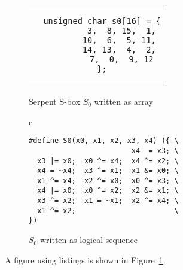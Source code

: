 \begin{figure}
\centering
\begin{minipage}[b]{0.45\textwidth}
\centering
\begin{tabular}{c}
\begin{lstlisting}
  unsigned char s0[16] = {
          3,  8, 15,  1,
         10,  6,  5, 11,
         14, 13,  4,  2,
          7,  0,  9, 12
  };
\end{lstlisting}
\end{tabular}
\caption{Serpent S-box $S_0$ written as array}
\label{fig:serpents0a}
\end{minipage}
\hspace{0.25cm}
\vline
\hspace{0.25cm}
\begin{minipage}[b]{0.45\textwidth}
\centering
\begin{tabular}{c}
\begin{lstlisting}
#define S0(x0, x1, x2, x3, x4) ({ \
                        x4  = x3; \
  x3 |= x0;  x0 ^= x4;  x4 ^= x2; \
  x4 = ~x4;  x3 ^= x1;  x1 &= x0; \
  x1 ^= x4;  x2 ^= x0;  x0 ^= x3; \
  x4 |= x0;  x0 ^= x2;  x2 &= x1; \
  x3 ^= x2;  x1 = ~x1;  x2 ^= x4; \
  x1 ^= x2;                       \
})
\end{lstlisting}
\end{tabular}
\caption{$S_0$ written as logical sequence}
\label{fig:serpents0l}
\end{minipage}
\end{figure}


A figure using listings is shown in Figure~\ref{fig:serpents0l}. \blindtext


